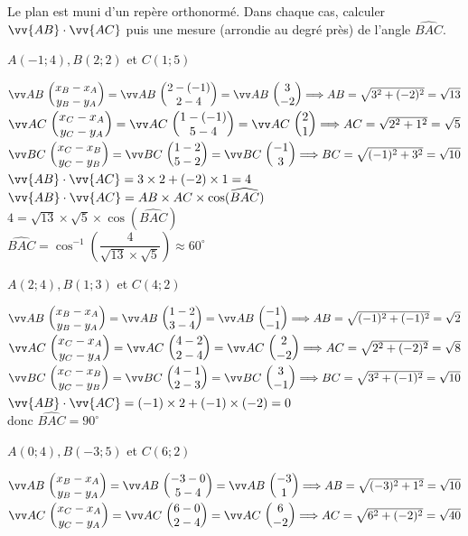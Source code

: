 \documentclass[11pt,a4paper]{article}  %
\begin{document}
\exerciceDS{}
Le plan est muni d'un repère orthonormé. Dans chaque cas, calculer $\vv{A B} \cdot \vv{A C}$ puis une mesure (arrondie au degré près) de l'angle $\widehat{B A C}$.
\begin{enumMet}
	\item $A(-1 ; 4), B(2 ; 2)$ et $C(1 ; 5)$\\
	\begin{corrBox}
		$\Coord{AB}{x_B-x_A}{y_B-y_A}=\Coord{AB}{2-(-1)}{2-4}=\Coord{AB}{3}{-2} \Longrightarrow AB=\sqrt{3^2+(-2)^2}=\sqrt{13}$\\
		$\Coord{AC}{x_C-x_A}{y_C-y_A}=\Coord{AC}{1-(-1)}{5-4}=\Coord{AC}{2}{1} \Longrightarrow AC=\sqrt{2^2+1^2}=\sqrt{5}$\\
		$\Coord{BC}{x_C-x_B}{y_C-y_B}=\Coord{BC}{1-2}{5-2}=\Coord{BC}{-1}{3} \Longrightarrow BC=\sqrt{(-1)^2+3^2}=\sqrt{10}$\\
		$\vv{A B} \cdot \vv{A C}=3\times2+(-2)\times1=4$\\
		$\vv{A B} \cdot \vv{A C}=AB\times AC\times\cos(\widehat{B A C})$\\
		$4=\sqrt{13}\times\sqrt{5}\times\cos(\widehat{B A C})$\\
		$\widehat{B A C}=\cos^{-1}\left(\dfrac{4}{\sqrt{13}\times\sqrt{5}}\right)\approx60^{\circ}$
	\end{corrBox}
	\item $A(2 ; 4), B(1 ; 3)$ et $C(4 ; 2)$\\
	\begin{corrBox}
		$\Coord{AB}{x_B-x_A}{y_B-y_A}=\Coord{AB}{1-2}{3-4}=\Coord{AB}{-1}{-1} \Longrightarrow AB=\sqrt{(-1)^2+(-1)^2}=\sqrt{2}$\\
		$\Coord{AC}{x_C-x_A}{y_C-y_A}=\Coord{AC}{4-2}{2-4}=\Coord{AC}{2}{-2} \Longrightarrow AC=\sqrt{2^2+(-2)^2}=\sqrt{8}$\\
		$\Coord{BC}{x_C-x_B}{y_C-y_B}=\Coord{BC}{4-1}{2-3}=\Coord{BC}{3}{-1} \Longrightarrow BC=\sqrt{3^2+(-1)^2}=\sqrt{10}$\\
		$\vv{A B} \cdot \vv{A C}=(-1)\times2+(-1)\times(-2)=0$\\
		donc $\widehat{B A C}=90^{\circ}$
	\end{corrBox}
	\item $A(0 ; 4), B(-3 ; 5)$ et $C(6 ; 2)$\\
	\begin{corrBox}
		$\Coord{AB}{x_B-x_A}{y_B-y_A}=\Coord{AB}{-3-0}{5-4}=\Coord{AB}{-3}{1} \Longrightarrow AB=\sqrt{(-3)^2+1^2}=\sqrt{10}$\\
		$\Coord{AC}{x_C-x_A}{y_C-y_A}=\Coord{AC}{6-0}{2-4}=\Coord{AC}{6}{-2} \Longrightarrow AC=\sqrt{6^2+(-2)^2}=\sqrt{40}$\\

\end{corrBox}
\end{enumMet}
\end{document}
